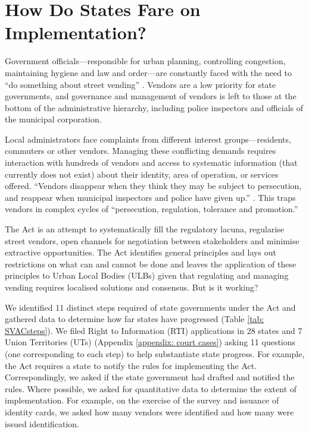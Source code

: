 \documentclass[a4paper, 12pt, twoside]{article}
\begin{document}
{%
\section*{How Do States Fare on Implementation?}
	Government officials—responsible for urban planning, controlling congestion, maintaining hygiene and law and order—are constantly faced with the need to “do something about street vending” \parencite{bromleypaper}. Vendors are a low priority for state governments, and governance and management of vendors is left to those at the bottom of the administrative hierarchy, including police inspectors and officials of the municipal corporation.

	Local administrators face complaints from different interest groups—residents, commuters or other vendors. Managing these conflicting demands requires interaction with hundreds of vendors and access to systematic information (that currently does not exist) about their identity, area of operation, or services offered. “Vendors disappear when they think they may be subject to persecution, and reappear when municipal inspectors and police have given up.” \parencite{bromleypaper}. This traps vendors in complex cycles of “persecution, regulation, tolerance and promotion.”

	The Act is an attempt to systematically fill the regulatory lacuna, regularise street vendors, open channels for negotiation between stakeholders and minimise extractive opportunities. The Act identifies general principles and lays out restrictions on what can and cannot be done and leaves the application of these principles to Urban Local Bodies (ULBs) given that regulating and managing vending requires localised solutions and consensus. But is it working?

	We identified 11 distinct steps required of state governments under the Act and gathered data to determine how far states have progressed (Table \ref{tab: SVACsteps}). We filed Right to Information (RTI) applications in 28 states and 7 Union Territories (UTs) (Appendix \ref{appendix: court cases}) asking 11 questions (one corresponding to each step) to help substantiate state progress. For example, the Act requires a state to notify the rules for implementing the Act. Correspondingly, we asked if the state government had drafted and notified the rules. Where possible, we asked for quantitative data to determine the extent of implementation. For example, on the exercise of the survey and issuance of identity cards, we asked how many vendors were identified and how many were issued identification.

}
\end{document}
